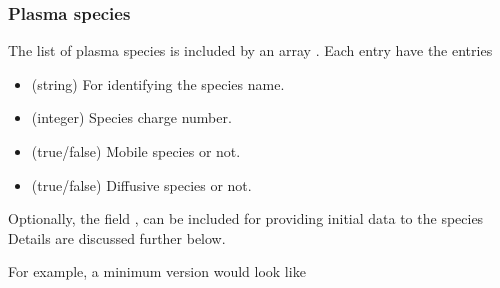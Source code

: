\documentclass[letterpaper,10pt,english]{sphinxmanual}
\begin{document}
\subsubsection{Plasma species}
\label{\detokenize{Applications/CdrPlasmaModel:plasma-species}}\label{\detokenize{Applications/CdrPlasmaModel:chap-plasmaspeciesjson}}
The list of plasma species is included by an array .
Each entry  have the entries
\begin{itemize}
\item {} 
 (string) For identifying the species name.

\item {} 
 (integer) Species charge number.

\item {} 
 (true/false) Mobile species or not.

\item {} 
 (true/false) Diffusive species or not.

\end{itemize}

Optionally, the field , can be included for providing initial data to the species
Details are discussed further below.

For example, a minimum version would look like

\begin{sphinxVerbatim}[commandchars=\\\{\},formatcom=\scriptsize]
  \PYG{p}{[}
            
            
           
  \PYG{p}{]}
\end{sphinxVerbatim}
\end{document}
